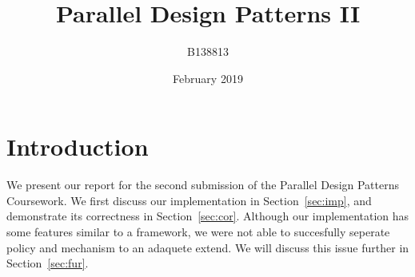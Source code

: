 \documentclass[oneside]{article}
\title{Parallel Design Patterns II}
\author{B138813}
\date{February 2019}
\begin{document}

\maketitle
\section{Introduction}
We present our report for the second submission of the Parallel Design Patterns Coursework. We first discuss our implementation in Section~\ref{sec:imp}, and demonstrate its correctness in Section~\ref{sec:cor}. Although our implementation has some features similar to a framework, we were not able to succesfully seperate policy and mechanism to an adaquete extend. We will discuss this issue further in Section~\ref{sec:fur}.
\end{document}
